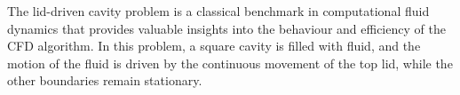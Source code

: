 The lid-\/driven cavity problem is a classical benchmark in computational fluid dynamics that provides valuable insights into the behaviour and efficiency of the CFD algorithm. In this problem, a square cavity is filled with fluid, and the motion of the fluid is driven by the continuous movement of the top lid, while the other boundaries remain stationary. 